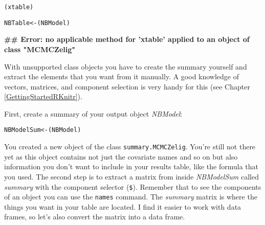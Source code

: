 {\small
\begin{knitrout}
\color{fgcolor}\begin{kframe}
\begin{alltt}
(xtable)

NBTable <- (NBModel)
\end{alltt}


{\ttfamily\noindent\bfseries\textcolor{errorcolor}{\#\# Error: no applicable method for 'xtable' applied to an object of class "MCMCZelig"}}\end{kframe}
\end{knitrout}

}
\noindent With unsupported class objects you have to create the summary yourself and extract the elements that you want from it manually. A good knowledge of vectors, matrices, and component selection is very handy for this (see Chapter \ref{GettingStartedRKnitr}). 

First, create a summary of your output object {\emph{NBModel}}:

\begin{knitrout}
\color{fgcolor}\begin{kframe}
\begin{alltt}
NBModelSum <- (NBModel)
\end{alltt}
\end{kframe}
\end{knitrout}


\noindent You created a new object of the class {\tt{summary.MCMCZelig}}. You're still not there yet as this object contains not just the covariate names and so on but also information you don't want to include in your results table, like the formula that you used. The second step is to extract a matrix from inside {\emph{NBModelSum}} called {\emph{summary}} with the component selector ({\tt{\$}}). Remember that to see the components of an object you can use the \texttt{names} command. The {\emph{summary}} matrix is where the things you want in your table are located. I find it easier to work with data frames, so let's also convert the matrix into a data frame.

\begin{knitrout}
\color{fgcolor}
\end{knitrout}

